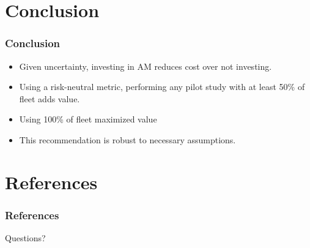 \documentclass{beamer}
\begin{document}
\section{Conclusion}
\begin{frame}
  \frametitle{Conclusion}
  \begin{itemize}
  \item Given uncertainty, investing in AM reduces cost over not investing.
  \item Using a risk-neutral metric, performing any pilot study with
    at least 50\% of fleet adds value.
  \item Using 100\% of fleet maximized value
  \item This recommendation is robust to necessary assumptions.
  \end{itemize}
\end{frame}


\section{References}
\begin{frame}
  \frametitle{References}
  Questions? \\~\\
  {}
  
\end{frame}
\end{document}
